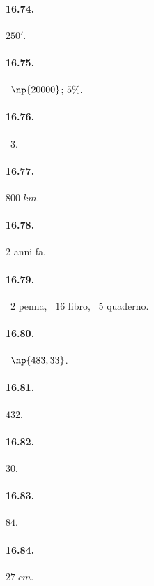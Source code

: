 \begin{multicols}{2}
\paragraph{16.74.}
$250'$.

\paragraph{16.75.}
\officialeuro~$\np{20000}$; $5\%$.

\paragraph{16.76.}
\officialeuro~$3$.

\paragraph{16.77.}
$800\;\unit{km}$.

\paragraph{16.78.}
$2$ anni fa.

\paragraph{16.79.}
\officialeuro~$2$ penna, \officialeuro~$16$ libro, \officialeuro~$5$ quaderno.

\paragraph{16.80.}
\officialeuro~$\np{483,33}$.

\paragraph{16.81.}
$432$.

\paragraph{16.82.}
$30$.

\paragraph{16.83.}
$84$.

\paragraph{16.84.}
$27\;\unit{cm}$.


\end{multicols}
